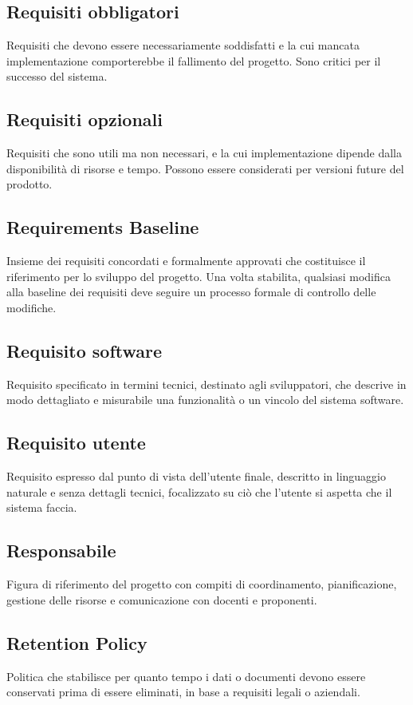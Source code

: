 \documentclass[a4paper,11pt]{article}
\begin{document}
\subsection{Requisiti obbligatori}
Requisiti che devono essere necessariamente soddisfatti e la cui mancata implementazione comporterebbe il fallimento del progetto. Sono critici per il successo del sistema.

\subsection{Requisiti opzionali}
Requisiti che sono utili ma non necessari, e la cui implementazione dipende dalla disponibilità di risorse e tempo. Possono essere considerati per versioni future del prodotto.

\subsection{Requirements Baseline}
Insieme dei requisiti concordati e formalmente approvati che costituisce il riferimento per lo sviluppo del progetto. Una volta stabilita, qualsiasi modifica alla baseline dei requisiti deve seguire un processo formale di controllo delle modifiche.

\subsection{Requisito software}
Requisito specificato in termini tecnici, destinato agli sviluppatori, che descrive in modo dettagliato e misurabile una funzionalità o un vincolo del sistema software.

\subsection{Requisito utente}
Requisito espresso dal punto di vista dell'utente finale, descritto in linguaggio naturale e senza dettagli tecnici, focalizzato su ciò che l'utente si aspetta che il sistema faccia.

\subsection{Responsabile}
Figura di riferimento del progetto con compiti di coordinamento, pianificazione, gestione delle risorse e comunicazione con docenti e proponenti.

\subsection{Retention Policy}
Politica che stabilisce per quanto tempo i dati o documenti devono essere conservati prima di essere eliminati, in base a requisiti legali o aziendali.
\end{document}
